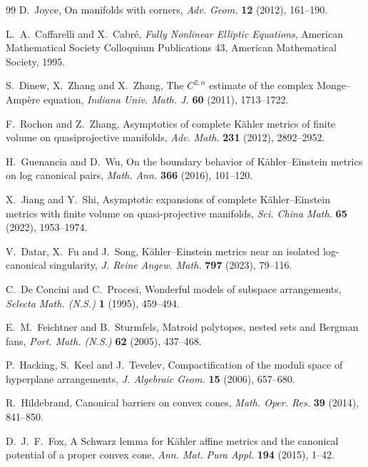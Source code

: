 \documentclass[11pt,a4paper]{ltjsarticle}
\theoremstyle{plain}
\theoremstyle{definition}
\theoremstyle{remark}
\begin{document}
\begin{thebibliography}{99}
D.~Joyce,
\newblock On manifolds with corners,
\newblock \emph{Adv. Geom.} \textbf{12} (2012), 161--190.

L.~A.~Caffarelli and X.~Cabr\'e,
\newblock \emph{Fully Nonlinear Elliptic Equations},
\newblock American Mathematical Society Colloquium Publications 43, American Mathematical Society, 1995.

S.~Dinew, X.~Zhang and X.~Zhang,
\newblock The $C^{2,\alpha}$ estimate of the complex Monge--Amp\`ere equation,
\newblock \emph{Indiana Univ. Math. J.} \textbf{60} (2011), 1713--1722.

F.~Rochon and Z.~Zhang,
\newblock Asymptotics of complete K\"ahler metrics of finite volume on quasiprojective manifolds,
\newblock \emph{Adv. Math.} \textbf{231} (2012), 2892--2952.

H.~Guenancia and D.~Wu,
\newblock On the boundary behavior of K\"ahler--Einstein metrics on log canonical pairs,
\newblock \emph{Math. Ann.} \textbf{366} (2016), 101--120.

X.~Jiang and Y.~Shi,
\newblock Asymptotic expansions of complete K\"ahler--Einstein metrics with finite volume on quasi-projective manifolds,
\newblock \emph{Sci. China Math.} \textbf{65} (2022), 1953--1974.

V.~Datar, X.~Fu and J.~Song,
\newblock K\"ahler--Einstein metrics near an isolated log-canonical singularity,
\newblock \emph{J. Reine Angew. Math.} \textbf{797} (2023), 79--116.

C.~De Concini and C.~Procesi,
\newblock Wonderful models of subspace arrangements,
\newblock \emph{Selecta Math. (N.S.)} \textbf{1} (1995), 459--494.

E.~M.~Feichtner and B.~Sturmfels,
\newblock Matroid polytopes, nested sets and Bergman fans,
\newblock \emph{Port. Math. (N.S.)} \textbf{62} (2005), 437--468.

P.~Hacking, S.~Keel and J.~Tevelev,
\newblock Compactification of the moduli space of hyperplane arrangements,
\newblock \emph{J. Algebraic Geom.} \textbf{15} (2006), 657--680.

R.~Hildebrand,
\newblock Canonical barriers on convex cones,
\newblock \emph{Math. Oper. Res.} \textbf{39} (2014), 841--850.

D.~J.~F.~Fox,
\newblock A Schwarz lemma for K\"ahler affine metrics and the canonical potential of a proper convex cone,
\newblock \emph{Ann. Mat. Pura Appl.} \textbf{194} (2015), 1--42.


\end{thebibliography}
\end{document}
